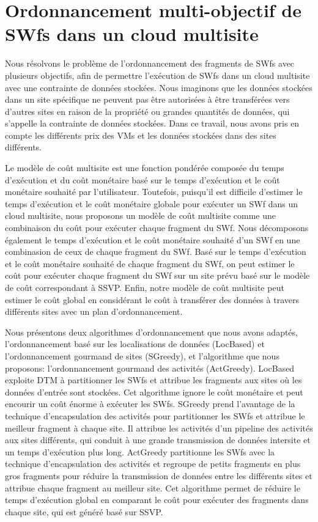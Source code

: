 \section*{Ordonnancement multi-objectif de SWfs dans un cloud multisite}
Nous résolvons le problème de l'ordonnancement des fragments de SWfs avec plusieurs objectifs, afin de permettre l'exécution de SWfs dans un cloud multisite avec une contrainte de données stockées. Nous imaginons que les données stockées dans un site spécifique ne peuvent pas être autorisées à être transférées vers d'autres sites en raison de la propriété ou grandes quantités de données, qui s'appelle la contrainte de données stockées. Dans ce travail, nous avons pris en compte les différents prix des VMs et les données stockées dans des sites différents.

Le modèle de coût multisite est une fonction pondérée composée du temps d'exécution et du coût monétaire basé sur le temps d'exécution et le coût monétaire souhaité par l'utilisateur. Toutefois, puisqu'il est difficile d'estimer le temps d'exécution et le coût monétaire globale pour exécuter un SWf dans un cloud multisite, nous proposons un modèle de coût multisite comme une combinaison du coût pour exécuter chaque fragment du SWf. Nous décomposons également le temps d'exécution et le coût monétaire souhaité d'un SWf en une combinasion de ceux de chaque fragment du SWf. Basé sur le temps d'exécution et le coût monétaire souhaité de chaque fragment du SWf, on peut estimer le coût pour exécuter chaque fragment du SWf sur un site prévu basé sur le modèle de coût correspondant à SSVP. Enfin, notre modèle de coût multisite peut estimer le coût global en considérant le coût à transférer des données à travers différents sites avec un plan d'ordonnancement.

Nous présentons deux algorithmes d'ordonnancement que nous avons adaptés, l'ordonnancement basé sur les localisations de données (LocBased) et l'ordonnancement gourmand de sites (SGreedy), et l'algorithme que nous proposons: l'ordonnancement gourmand des activités (ActGreedy). LocBased exploite DTM à partitionner les SWfs et attribue les fragments aux sites où les données d'entrée sont stockées. Cet algorithme ignore le coût monétaire et peut encourir un coût énorme à exécuter les SWfs. SGreedy prend l'avantage de la technique d'encapsulation des activités pour partitionner les SWfs et attribue le meilleur fragment à chaque site. Il attribue les activités d'un pipeline des activités aux sites différents, qui conduit à une grande transmission de données intersite et un temps d'exécution plus long. ActGreedy partitionne les SWfs avec la technique d'encapsulation des activités et regroupe de petits fragments en plus gros fragments pour réduire la transmission de données entre les différents sites et attribue chaque fragment au meilleur site. Cet algorithme permet de réduire le temps d'exécution global en comparant le coût pour exécuter des fragments dans chaque site, qui est généré basé sur SSVP.
 
